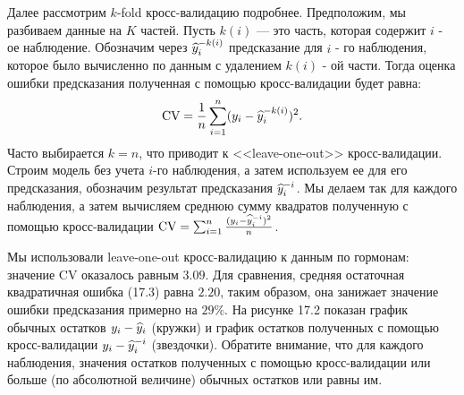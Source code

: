 Далее рассмотрим $k$-fold кросс-валидацию подробнее. Предположим, мы разбиваем данные на $K$ частей. Пусть $k(i)$ --- это часть, которая содержит $i$ - ое наблюдение. Обозначим через $\widehat{y}_{i}^{-k(i)}$ предсказание для $i$ - го наблюдения, которое было вычисленно по данным с удалением $k(i)$ - ой части. Тогда оценка ошибки предсказания полученная с помощью кросс-валидации будет равна:
\begin{equation}
\text{CV} = \frac{1}{n} \sum_{i = 1}^{n} (y_{i} - \widehat{y}_{i}^{-k(i)})^{2}.
\end{equation}
Часто выбирается $k = n$, что приводит к <<leave-one-out>> кросс-валидации. Строим модель без учета $i$-го наблюдения, а затем используем ее для его предсказания, обозначим результат предсказания $\widehat{y}_{i}^{-i}$. Мы делаем так для каждого наблюдения, а затем вычисляем среднюю сумму квадратов полученную с помощью кросс-валидации $\text{CV} = \sum_{i = 1}^{n} \frac{(y_{i} - \widehat{y}_{i}^{-i})^{2}}{n}$.

Мы использовали leave-one-out кросс-валидацию к данным по гормонам: значение CV оказалось равным $3.09$. Для сравнения, средняя остаточная квадратичная ошибка (17.3) равна $2.20$, таким образом, она занижает значение ошибки предсказания примерно на $29\%$. На рисунке 17.2 показан график обычных остатков $y_{i} - \widehat{y}_{i}$ (кружки) и график остатков полученных с помощью кросс-валидации $y_{i} - \widehat{y}_{i}^{-i}$ (звездочки). Обратите внимание, что для каждого наблюдения, значения остатков полученных с помощью кросс-валидации или больше (по абсолютной величине) обычных остатков или равны им. 
\begin{figure}[h]
\end{figure}

